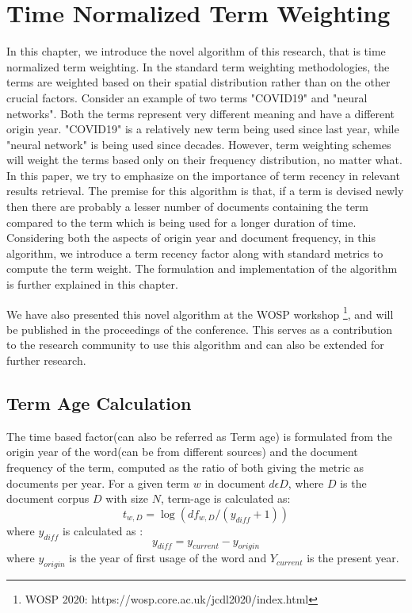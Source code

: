 \chapter{Time Normalized Term Weighting}
In this chapter, we introduce the novel algorithm of this research, that is time normalized term weighting. In the standard term weighting methodologies, the terms are weighted based on their spatial distribution rather than on the other crucial factors. Consider an example of two terms "COVID19" and "neural networks". Both the terms represent very different meaning and have a different origin year. "COVID19" is a relatively new term being used since last year, while "neural network" is being used since decades. However, term weighting schemes will weight the terms based only on their frequency distribution, no matter what. In this paper, we try to emphasize on the importance of term recency in relevant results retrieval. The premise for this algorithm is that, if a term is devised newly then there are probably a lesser number of documents containing the term compared to the term which is being used for a longer duration of time. Considering both the aspects of origin year and document frequency, in this algorithm, we introduce a term recency factor along with standard metrics to compute the term weight. The formulation and implementation of the algorithm is further explained in this chapter.

We have also presented this novel algorithm at the WOSP workshop \footnote{WOSP 2020: https://wosp.core.ac.uk/jcdl2020/index.html}, and will be published in the proceedings of the conference. This serves as a contribution to the research community to use this algorithm and can also be extended for further research.

\section{Term Age Calculation}
The time based factor(can also be referred as Term age) is formulated from the origin year of the word(can be from different sources) and the document frequency of the term, computed as the ratio of both giving the metric as documents per year. For a given term $w$ in document $d  \epsilon D$, where $D$  is the document corpus $D$ with size $N$, term-age is calculated as:
\begin{equation}
    t_{w,D}=\log(df_{w,D}/(y_{diff}+1))
\end{equation}
where $y_{diff}$ is calculated as :
\begin{equation}
    y_{diff} = y_{current} - y_{origin}
\end{equation}
where $y_{origin}$ is the year of first usage of the word and $Y_{current}$ is the present year.

